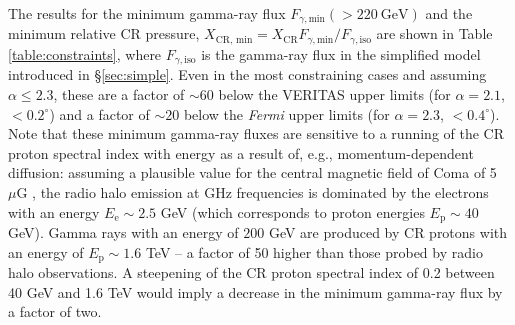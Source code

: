 \documentclass[12pt,manuscript]{aastex}
\def\C#1{#1}
\def\Fermi{{\em Fermi}\xspace}
\newcommand{\rmn}{\mathrm}
\newcommand{\CR}{\mathrm{CR}}
\begin{document}
The results for the minimum gamma-ray flux $F_{\gamma,\rmn{min}}(>220~\rmn{GeV})$ and the minimum
relative CR pressure, $X_{\CR,\,\rmn{min}} = X_\CR F_{\gamma,\rmn{min}}/F_{\gamma,\rmn{iso}}$ are
shown in Table \ref{table:constraints}, where $F_{\gamma,\rmn{iso}}$ is the gamma-ray flux in the
simplified model introduced in \S\ref{sec:simple}. \C{Even in the most constraining cases and
assuming $\alpha\leq 2.3$, these are a factor of $\sim 60$ below the VERITAS upper limits (for
$\alpha=2.1$, $<0.2^{\circ}$) and a factor of $\sim 20$ below the \Fermi upper limits (for
$\alpha=2.3$, $<0.4^{\circ}$)}. Note that these minimum gamma-ray fluxes are sensitive to a
running of the CR proton spectral index with energy as a result of, e.g., momentum-dependent
diffusion: assuming a plausible value for the central magnetic field of Coma of 5~$\mu$G
\citep{article:Bonafede_etal:2010}, the radio halo emission at GHz frequencies is dominated by the
electrons with an energy $E_\rmn{e} \sim 2.5$ GeV (which corresponds to proton energies $E_\rmn{p}
\sim 40$ GeV). Gamma rays with an energy of $200$ GeV are produced by CR protons with an energy of
$E_\rmn{p} \sim 1.6$ TeV -- a factor of 50 higher than those probed by radio halo observations. A
steepening of the CR proton spectral index of 0.2 between 40 GeV and 1.6 TeV would imply a decrease
in the minimum gamma-ray flux by a factor of two.

%
%
 
\end{document}
